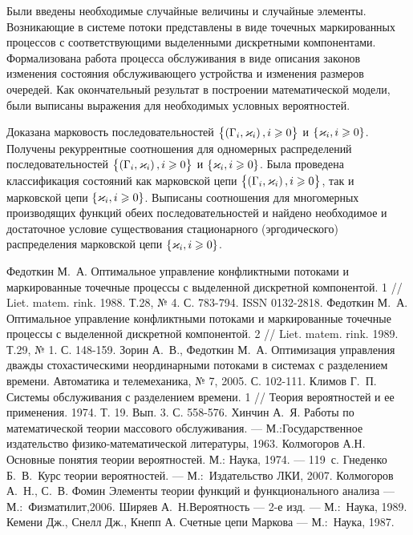 \documentclass[a4paper,14pt,russian]{article}
\newcommand{\G}{\Gamma}
\newcommand{\Mark}[0]{\brrr{\br{\G_i, \vk_i}, i \geqslant 0}}
\newcommand{\Markk}[0]{\brrr{ \vk_i, i \geqslant 0}}
\begin{document}
Были введены необходимые случайные величины и случайные элементы. Возникающие в системе потоки представлены в виде точечных маркированных процессов с соответствующими выделенными дискретными компонентами. Формализована работа процесса обслуживания в виде описания законов изменения состояния обслуживающего устройства и изменения размеров очередей. Как окончательный результат в построении математической модели, были выписаны выражения для необходимых условных вероятностей.

Доказана марковость последовательностей $\Mark$ и $\Markk$. Получены рекуррентные соотношения для одномерных распределений последовательностей $\Mark$ и $\Markk$.  Была проведена классификация состояний как марковской цепи $\Mark$, так и марковской цепи $\Markk$. Выписаны соотношения для многомерных производящих функций обеих последовательностей и найдено необходимое и достаточное условие существования стационарного (эргодического) распределения марковской цепи $\Markk$.

\newpage

\begin{thebibliography}{99}
 Федоткин М.~А. Оптимальное управление конфликтными потоками и маркированные точечные процессы с выделенной дискретной компонентой. 1 // Liet. matem. rink. 1988. Т.28, № 4. С. 783-794. ISSN 0132-2818.
 Федоткин М.~А. Оптимальное управление конфликтными потоками и маркированные точечные процессы с выделенной дискретной компонентой. 2 //  Liet. matem. rink. 1989. Т.29, № 1. С. 148-159.
 Зорин А.~В., Федоткин М.~А. Оптимизация управления дважды стохастическими неординарными потоками в системах с разделением времени. Автоматика и телемеханика, № 7, 2005. С. 102-111.
 Климов Г.~П. Системы обслуживания с разделением времени. 1 // Теория вероятностей и ее применения. 1974. Т. 19. Вып. 3. С. 558-576.
 Хинчин А.~Я. Работы по математической теории массового обслуживания. --- М.:Государственное издательство физико-математической литературы, 1963.
 Колмогоров А.Н. Основные понятия теории
  вероятностей. М.: Наука, 1974. --- 119~с.
 Гнеденко Б.~В.\ Курс теории вероятностей. --- М.:~Издательство ЛКИ, 2007.
 Колмогоров А.~Н., С.~В. Фомин Элементы теории функций и функционального анализа --- М.:~Физматилит,2006.
 Ширяев А.~Н.Вероятность --- 2-е изд. --- М.:~Наука, 1989.
 Кемени Дж., Снелл Дж., Кнепп А. Счетные цепи Маркова --- М.:~Наука, 1987.
\end{thebibliography}
\end{document}
